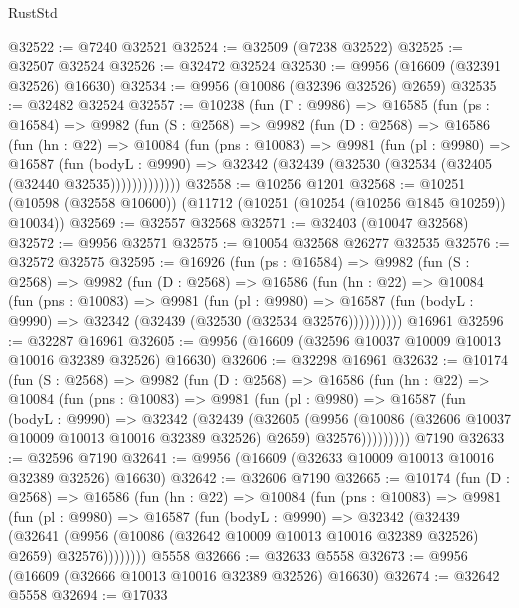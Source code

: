 \begin{lexlean}{RustStd}
\begin{coremodule}
@32522 := @7240 @32521
@32524 := @32509 (@7238 @32522)
@32525 := @32507 @32524
@32526 := @32472 @32524
@32530 := @9956 (@16609 (@32391 @32526) @16630)
@32534 := @9956 (@10086 (@32396 @32526) @2659)
@32535 := @32482 @32524
@32557 := @10238
    (fun (Γ : @9986) =>
    @16585
      (fun (ps : @16584) =>
      @9982
        (fun (S : @2568) =>
        @9982
          (fun (D : @2568) =>
          @16586
            (fun (hn : @22) =>
            @10084
              (fun (pns : @10083) =>
              @9981
                (fun (pl : @9980) =>
                @16587
                  (fun (bodyL : @9990) =>
                  @32342 (@32439 (@32530 (@32534 (@32405 (@32440 @32535)))))))))))))
@32558 := @10256 @1201
@32568 := @10251 (@10598 (@32558 @10600)) (@11712 (@10251 (@10254 (@10256 @1845 @10259)) @10034))
@32569 := @32557 @32568
@32571 := @32403 (@10047 @32568)
@32572 := @9956 @32571
@32575 := @10054 @32568 @26277 @32535
@32576 := @32572 @32575
@32595 := @16926
    (fun (ps : @16584) =>
    @9982
      (fun (S : @2568) =>
      @9982
        (fun (D : @2568) =>
        @16586
          (fun (hn : @22) =>
          @10084
            (fun (pns : @10083) =>
            @9981
              (fun (pl : @9980) =>
              @16587 (fun (bodyL : @9990) => @32342 (@32439 (@32530 (@32534 @32576))))))))))
    @16961
@32596 := @32287 @16961
@32605 := @9956 (@16609 (@32596 @10037 @10009 @10013 @10016 @32389 @32526) @16630)
@32606 := @32298 @16961
@32632 := @10174
    (fun (S : @2568) =>
    @9982
      (fun (D : @2568) =>
      @16586
        (fun (hn : @22) =>
        @10084
          (fun (pns : @10083) =>
          @9981
            (fun (pl : @9980) =>
            @16587
              (fun (bodyL : @9990) =>
              @32342
                (@32439
                  (@32605
                    (@9956
                      (@10086 (@32606 @10037 @10009 @10013 @10016 @32389 @32526) @2659)
                      @32576)))))))))
    @7190
@32633 := @32596 @7190
@32641 := @9956 (@16609 (@32633 @10009 @10013 @10016 @32389 @32526) @16630)
@32642 := @32606 @7190
@32665 := @10174
    (fun (D : @2568) =>
    @16586
      (fun (hn : @22) =>
      @10084
        (fun (pns : @10083) =>
        @9981
          (fun (pl : @9980) =>
          @16587
            (fun (bodyL : @9990) =>
            @32342
              (@32439
                (@32641
                  (@9956 (@10086 (@32642 @10009 @10013 @10016 @32389 @32526) @2659) @32576))))))))
    @5558
@32666 := @32633 @5558
@32673 := @9956 (@16609 (@32666 @10013 @10016 @32389 @32526) @16630)
@32674 := @32642 @5558
@32694 := @17033

\end{coremodule}
\end{lexlean}
